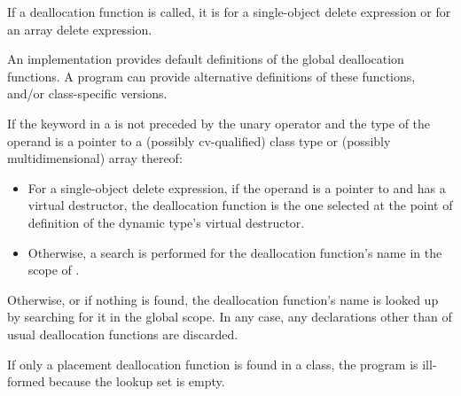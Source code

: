\pnum
If a deallocation function is called,
it is  for a single-object delete expression or
 for an array delete expression.
\begin{note}
%
An implementation provides default definitions of the global
deallocation functions.
A \Cpp{} program can provide alternative definitions of these
functions, and/or class-specific
versions.
\end{note}

\pnum
If the keyword  in a 
is not preceded by the unary \tcode{::} operator and the type of the operand is
a pointer to a (possibly cv-qualified) class type 
or (possibly multidimensional) array thereof:
\begin{itemize}
\item
For a single-object delete expression,
if the operand is a pointer to \cv{}  and
 has a virtual destructor,
the deallocation function is the one selected at the point of definition of
the dynamic type's virtual destructor.
\item
Otherwise,
a search is performed for the deallocation function's name
in the scope of .
\end{itemize}
Otherwise, or if nothing is found,
the deallocation function's name is looked up by
searching for it in the global scope.
In any case, any declarations
other than of usual deallocation functions
are discarded.
\begin{note}
If only a placement deallocation function is found in a class,
the program is ill-formed because the lookup set is empty.
\end{note}


